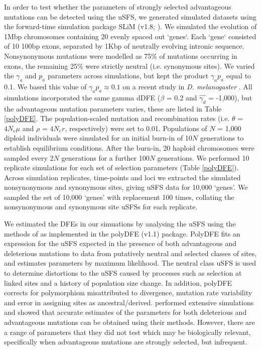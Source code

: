 \documentclass[11pt]{article}
\begin{document}
	In order to test whether the parameters of strongly selected advantageous mutations can be detected using the uSFS, we generated simulated datasets using the forward-time simulation package SLiM (v1.8; \citealt{RN148}). We simulated the evolution of 1Mbp chromosomes containing 20 evenly spaced out `genes`. Each `gene` consisted of 10 100bp exons, separated by 1Kbp of neutrally evolving intronic sequence. Nonsynonymous mutations were modelled as 75\% of mutations occurring in exons, the remaining 25\% were strictly neutral (i.e. synonymous sites). We varied the $\gamma_a$ and $p_a$ parameters across simulations, but kept the product $\gamma_a p_a$ equal to 0.1. We based this value of $\gamma_a p_a \approx 0.1$ on a recent study in \textit{D. melanogaster} \citep{RN321}. All simulations incorporated the same gamma dDFE ($\beta$ = 0.2 and $\hat{\gamma_d}$ = -1,000), but the advantageous mutation parameters varies, these are listed in Table \ref{polyDFE}. The population-scaled mutation and recombination rates (i.e. $\theta$ = \emph{$4N_{e}\mu$} and $\rho$ = \emph{$4N_{e}r$}, respectively) were set to 0.01. Populations of $N$ = 1,000 diploid individuals were simulated for an initial burn-in of 10$N$ generations to establish equilibrium conditions. After the burn-in, 20 haploid chromosomes were sampled every 2$N$ generations for a further 100$N$ generations. We performed 10 replicate simulations for each set of selection parameters (Table \ref{polyDFE}). Across simulation replicates, time-points and loci we extracted the simulated nonsynonymous and synonymous sites, giving uSFS data for 10,000 `genes'. We sampled the set of 10,000 `genes' with replacement 100 times, collating the nonsynonymous and synonymous site uSFSs for each replicate.
	
	We estimated the DFEs in our simuations by analysing the uSFS using the methods of \cite{RN354} as implemented in the polyDFE (v1.1) package. PolyDFE fits an expression for the uSFS expected in the presence of both advantageous and deleterious mutations to data from putatively neutral and selected classes of sites, and estimates parameters by maximum likelihood. The neutral class uSFS is used to determine distortions to the uSFS caused by processes such as selection at linked sites and a history of population size change. In addition, polyDFE corrects for polymorphism misattributed to divergence, mutation rate variability and error in assigning sites as ancestral/derived. \cite{RN354} performed extensive simulations and showed that accurate estimates of the parameters for both deleterious and advantageous mutations can be obtained using their methods. However, there are a range of parameters that they did not test which may be biologically relevant, specifically when advantageous mutations are strongly selected, but infrequent.
\end{document}
